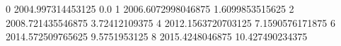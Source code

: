 0 2004.997314453125 0.0
1 2006.6072998046875 1.6099853515625
2 2008.721435546875 3.72412109375
4 2012.1563720703125 7.1590576171875
6 2014.572509765625 9.5751953125
8 2015.4248046875 10.427490234375
